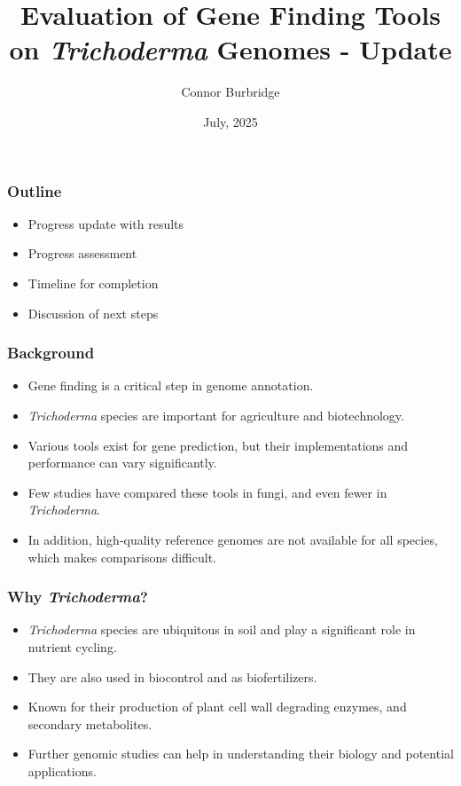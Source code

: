 \documentclass[t]{beamer}
\title{Evaluation of Gene Finding Tools on \textit{Trichoderma} Genomes - Update}
\date{July, 2025}
\author{Connor Burbridge}
\institute{Department of Computer Science}
\begin{document}
\begin{frame}
	\titlepage
\end{frame}

\begin{frame}
	\frametitle{Outline} 

	\begin{itemize}
		\item Progress update with results
		\item Progress assessment
		\item Timeline for completion	
		\item Discussion of next steps
	\end{itemize}
\end{frame}

\begin{frame}
	\frametitle{Background} 
	\begin{itemize}
		\item Gene finding is a critical step in genome annotation.
		\item \textit{Trichoderma} species are important for agriculture and biotechnology.
		\item Various tools exist for gene prediction, but their implementations and performance can vary significantly.
		\item Few studies have compared these tools in fungi, and even fewer in \textit{Trichoderma}.
		\item In addition, high-quality reference genomes are not available for all species, which makes comparisons difficult.
	\end{itemize}
\end{frame}

\begin{frame}
	\frametitle{Why \textit{Trichoderma}?}
	\begin{itemize}
		\item \textit{Trichoderma} species are ubiquitous in soil and play a significant role in nutrient cycling.
		\item They are also used in biocontrol and as biofertilizers.
		\item Known for their production of plant cell wall degrading enzymes, and secondary metabolites.
		\item Further genomic studies can help in understanding their biology and potential applications.
	\end{itemize}
\end{frame}
\end{document}
